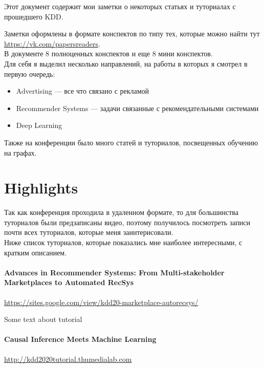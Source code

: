 Этот документ содержит мои заметки о некоторых статьях и туториалах с прошедшего KDD.

Заметки оформлены в формате конспектов по типу тех, которые можно найти тут \url{https://vk.com/papersreaders}. \\

В документе 8 полноценных конспектов и еще 8 мини конспектов. \\

Для себя я выделил несколько направлений, на работы в которых я смотрел в первую очередь:
\begin{itemize}
    \item Advertising --- все что связано с рекламой
    \item Recommender Systems --- задачи связанные с рекомендательными системами
    \item Deep Learning
\end{itemize}

Также на конференции было много статей и туториалов, посвещенных обучению на графах.

\section*{Highlights}

Так как конференция проходила в удаленном формате, то для большинства туториалов были предзаписаны видео, поэтому получилось посмотреть записи почти всех туториалов, которые меня заинтерисовали. \\

Ниже список туториалов, которые показались мне наиболее интересными, с кратким описанием.

\paragraph{Advances in Recommender Systems: From Multi-stakeholder Marketplaces to Automated RecSys} $ $\\

\url{https://sites.google.com/view/kdd20-marketplace-autorecsys/}

Some text about tutorial

\paragraph{Causal Inference Meets Machine Learning} $ $\\

\url{http://kdd2020tutorial.thumedialab.com}

